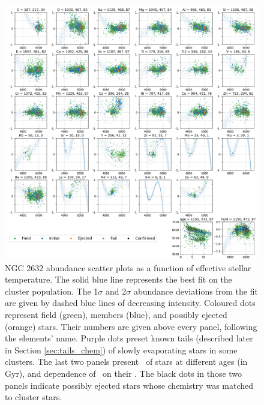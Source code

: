 \begin{figure}
	\centering
	\includegraphics[width=\textwidth]{p_teff_abundances_NGC_2682_orbits_DR3_new_flag0.png}
	\caption{NGC 2632 abundance scatter plots as a function of effective stellar temperature. The solid blue line represents the best fit on the cluster population. The 1$\sigma$ and 2$\sigma$ abundance deviations from the fit are given by dashed blue lines of decreasing intensity. Coloured dots represent field (green), members (blue), and possibly ejected (orange) stars. Their numbers are given above every panel, following the elements' name. Purple dots preset known tails (described later in Section \ref{sec:tails_chem}) of slowly evaporating stars in some clusters. The last two panels present \Teff\ of stars at different ages (in Gyr), and dependence of \Feh\ on their \Teff. The black dots in those two panels indicate possibly ejected stars whose chemistry was matched to cluster stars.}
	\label{fig:ct_cluster1}
\end{figure}

